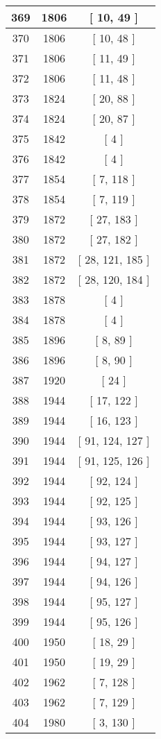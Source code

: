 \begin{center}
\begin{longtable}[H]{|| c c c ||}
369 & 1806 & [ 10, 49 ]
\\\hline
370 & 1806 & [ 10, 48 ]
\\\hline
371 & 1806 & [ 11, 49 ]
\\\hline
372 & 1806 & [ 11, 48 ]
\\\hline
373 & 1824 & [ 20, 88 ]
\\\hline
374 & 1824 & [ 20, 87 ]
\\\hline
375 & 1842 & [ 4 ]
\\\hline
376 & 1842 & [ 4 ]
\\\hline
377 & 1854 & [ 7, 118 ]
\\\hline
378 & 1854 & [ 7, 119 ]
\\\hline
379 & 1872 & [ 27, 183 ]
\\\hline
380 & 1872 & [ 27, 182 ]
\\\hline
381 & 1872 & [ 28, 121, 185 ]
\\\hline
382 & 1872 & [ 28, 120, 184 ]
\\\hline
383 & 1878 & [ 4 ]
\\\hline
384 & 1878 & [ 4 ]
\\\hline
385 & 1896 & [ 8, 89 ]
\\\hline
386 & 1896 & [ 8, 90 ]
\\\hline
387 & 1920 & [ 24 ]
\\\hline
388 & 1944 & [ 17, 122 ]
\\\hline
389 & 1944 & [ 16, 123 ]
\\\hline
390 & 1944 & [ 91, 124, 127 ]
\\\hline
391 & 1944 & [ 91, 125, 126 ]
\\\hline
392 & 1944 & [ 92, 124 ]
\\\hline
393 & 1944 & [ 92, 125 ]
\\\hline
394 & 1944 & [ 93, 126 ]
\\\hline
395 & 1944 & [ 93, 127 ]
\\\hline
396 & 1944 & [ 94, 127 ]
\\\hline
397 & 1944 & [ 94, 126 ]
\\\hline
398 & 1944 & [ 95, 127 ]
\\\hline
399 & 1944 & [ 95, 126 ]
\\\hline
400 & 1950 & [ 18, 29 ]
\\\hline
401 & 1950 & [ 19, 29 ]
\\\hline
402 & 1962 & [ 7, 128 ]
\\\hline
403 & 1962 & [ 7, 129 ]
\\\hline
404 & 1980 & [ 3, 130 ]
\\\hline

\end{longtable}
\end{center}
